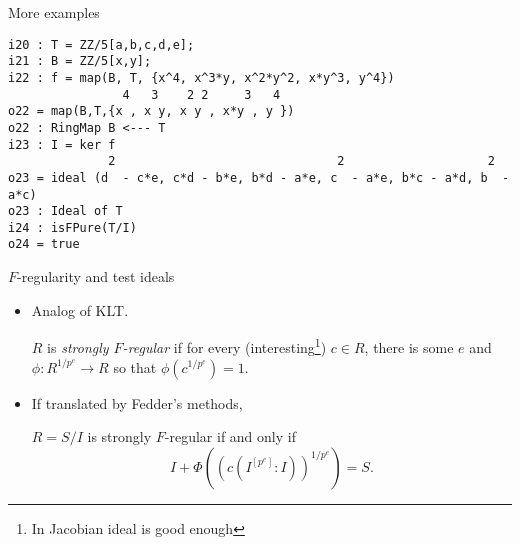 \documentclass[xcolor=dvipsnames]{beamer}
\newcommand{\memph}[1]{{\color{Red}\emph{#1}}}
\theoremstyle{remark}
\begin{document}
\begin{frame}[fragile]{More examples}
  \begin{verbatim}
i20 : T = ZZ/5[a,b,c,d,e];
i21 : B = ZZ/5[x,y];
i22 : f = map(B, T, {x^4, x^3*y, x^2*y^2, x*y^3, y^4})
                4   3    2 2     3   4
o22 = map(B,T,{x , x y, x y , x*y , y })
o22 : RingMap B <--- T
i23 : I = ker f
              2                               2                    2
o23 = ideal (d  - c*e, c*d - b*e, b*d - a*e, c  - a*e, b*c - a*d, b  - a*c)
o23 : Ideal of T
i24 : isFPure(T/I)
o24 = true
  \end{verbatim}
\end{frame}

\begin{frame}[t]{$F$-regularity and test ideals}
  \begin{itemize}
    \item<1->  Analog of KLT.
    \begin{definition}
      $R$ is \memph{strongly $F$-regular} if for every (interesting\footnote{In Jacobian ideal is good enough}) $c \in R$, there is some $e$ and $\phi : R^{1/p^e} \to R$ so that $\phi(c^{1/p^e}) = 1$.
    \end{definition}
    \item<2->  If translated by Fedder's methods,
    \begin{theorem}
      $R = S/I$ is strongly $F$-regular if and only if
      \[
      I + \Phi( (c(I^{[p^e]} : I))^{1/p^e} ) = S.
      \]
    \end{theorem}
  \end{itemize}
\end{frame}
\end{document}

